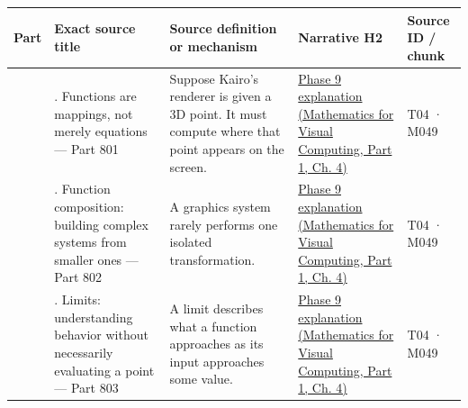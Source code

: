 {\def\LTcaptype{none} %
\begin{longtable}[]{@{}
  >{\raggedleft\arraybackslash}p{}
  >{\raggedright\arraybackslash}p{}
  >{\raggedright\arraybackslash}p{}
  >{\raggedright\arraybackslash}p{}
  >{\raggedright\arraybackslash}p{}@{}}
\toprule\noalign{}
\begin{minipage}[b]{\linewidth}\raggedleft
Part
\end{minipage} & \begin{minipage}[b]{\linewidth}\raggedright
Exact source title
\end{minipage} & \begin{minipage}[b]{\linewidth}\raggedright
Source definition or mechanism
\end{minipage} & \begin{minipage}[b]{\linewidth}\raggedright
Narrative H2
\end{minipage} & \begin{minipage}[b]{\linewidth}\raggedright
Source ID / chunk
\end{minipage} \\
\midrule\noalign{}
\endhead
\bottomrule\noalign{}
\endlastfoot
801 & 1. Functions are mappings, not merely equations --- Part 801 & Suppose Kairo's renderer is given a 3D point. It must compute where that point appears on the screen. & \href{../02-Mathematics-for-Visual-Computing-P01/main.pdf\#nameddest=01-foundations-i-ch020-functions-limits-continuity-and-scalar-change}{Phase 9 explanation (Mathematics for Visual Computing, Part 1, Ch. 4)} & T04 · M049 \\
802 & 2. Function composition: building complex systems from smaller ones --- Part 802 & A graphics system rarely performs one isolated transformation. & \href{../02-Mathematics-for-Visual-Computing-P01/main.pdf\#nameddest=01-foundations-i-ch020-functions-limits-continuity-and-scalar-change}{Phase 9 explanation (Mathematics for Visual Computing, Part 1, Ch. 4)} & T04 · M049 \\
803 & 3. Limits: understanding behavior without necessarily evaluating a point --- Part 803 & A limit describes what a function approaches as its input approaches some value. & \href{../02-Mathematics-for-Visual-Computing-P01/main.pdf\#nameddest=01-foundations-i-ch020-functions-limits-continuity-and-scalar-change}{Phase 9 explanation (Mathematics for Visual Computing, Part 1, Ch. 4)} & T04 · M049 \\

\end{longtable}}
